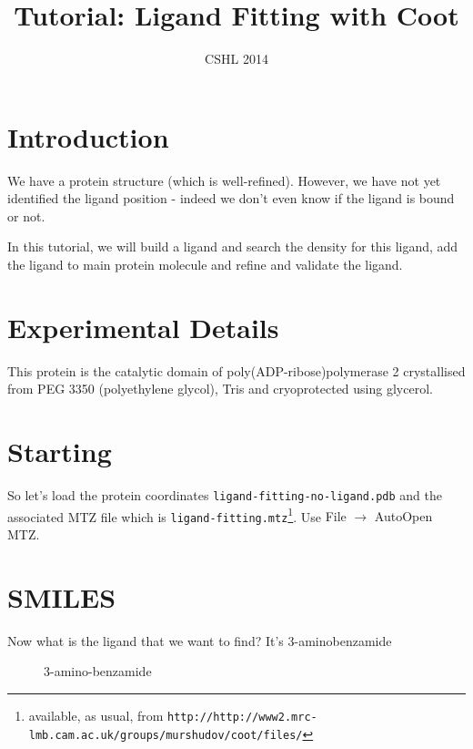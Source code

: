 \documentclass{article}
\title{Tutorial: Ligand Fitting with Coot}
\author{CSHL 2014}
\begin{document}
\maketitle
 

\section{Introduction}

We have a protein structure (which is well-refined). However, we have
not yet identified the ligand position - indeed we don't even know if
the ligand is bound or not.  

In this tutorial, we will build a ligand
and search the density for this ligand, add the ligand to main protein
molecule and refine and validate the ligand.

\section{Experimental Details}

 This protein is the catalytic domain of poly(ADP-ribose)polymerase 2
 crystallised from PEG 3350 (polyethylene glycol), Tris and
 cryoprotected using glycerol.

\section{Starting}

 So let's load the protein coordinates
 \texttt{ligand-fitting-no-ligand.pdb} and the associated MTZ file
 which is \texttt{ligand-fitting.mtz}\footnote{available, as usual, 
from \texttt{\small http://http://www2.mrc-lmb.cam.ac.uk/groups/murshudov/coot/files/}}.  
Use \textsf{File $\rightarrow$ AutoOpen MTZ}.

\section{SMILES}

 Now what is the ligand that we want to find? It's 3-aminobenzamide

\begin{figure}[htbp]
  \begin{center}
    \leavevmode
    \epsfxsize 30mm
    \caption{3-amino-benzamide}{}
    \label{fig:3-amino-benzamide}
  \end{center}
\end{figure}
\end{document}
